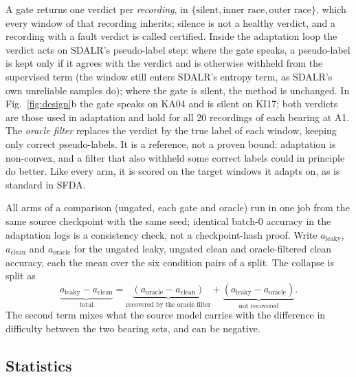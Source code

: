 A gate returns one verdict per \emph{recording}, in $\{\text{silent},\text{inner race},\text{outer race}\}$, which every
window of that recording inherits; silence is not a healthy verdict, and a recording with a fault verdict is called certified. Inside the adaptation loop the verdict acts on SDALR's
pseudo-label step: where the gate speaks, a pseudo-label is kept only if it agrees with the verdict and is otherwise
withheld from the supervised term (the window still enters SDALR's entropy term, as SDALR's own unreliable samples do);
where the gate is silent, the method is unchanged. In Fig.~\ref{fig:design}b the gate speaks on KA04 and is silent on
KI17; both verdicts are those used in adaptation and hold for all 20 recordings of each bearing at A1. The \emph{oracle filter} replaces the verdict by the true label of each
window, keeping only correct pseudo-labels. It is a reference, not a proven bound: adaptation is non-convex, and a filter
that also withheld some correct labels could in principle do better. Like every arm, it is scored on the target windows it
adapts on, as is standard in SFDA.

All arms of a comparison (ungated, each gate and oracle) run in one job from the same source checkpoint with the same
seed; identical batch-0 accuracy in the adaptation logs is a consistency check, not a checkpoint-hash proof. Write $a_{\mathrm{leaky}}$,
$a_{\mathrm{clean}}$ and $a_{\mathrm{oracle}}$ for the ungated leaky, ungated clean and oracle-filtered clean accuracy, each
the mean over the six condition pairs of a split. The collapse is split as
\begin{equation}
\underbrace{a_{\mathrm{leaky}}-a_{\mathrm{clean}}}_{\text{total}}
=\underbrace{\left(a_{\mathrm{oracle}}-a_{\mathrm{clean}}\right)}_{\text{recovered by the oracle filter}}
+\underbrace{\left(a_{\mathrm{leaky}}-a_{\mathrm{oracle}}\right)}_{\text{not recovered}}.
\label{eq:decomp}
\end{equation}
The second term mixes what the source model carries with the difference in difficulty between the two bearing sets, and
can be negative.

\subsection{Statistics}

